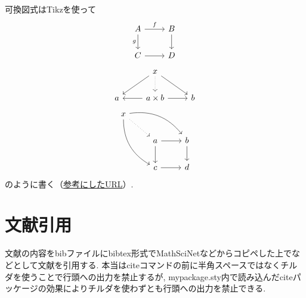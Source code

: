 \documentclass[11pt,a4paper,oneside,lualatex]{ltjsarticle} %
\begin{document}

可換図式はTikzを使って
\[
\begin{tikzcd}
	A \ar[r, "f"] \arrow[d, "g"'] & B \ar[d] \\
	C \ar[r] & D
\end{tikzcd}
\]
\[
\begin{tikzcd}
	& x \arrow[ld] \arrow[d, dotted] \arrow[rd] & \\
	a & a\times b \arrow[l] \arrow[r] & b
\end{tikzcd}
\]
\[
\begin{tikzcd}
	x \arrow[ddr, bend right] \arrow[rrd, bend left] \arrow[rd, dotted] & & \\
	& a \arrow[r] \arrow[d] & b \arrow[d] \\
	& c \arrow[r] & d
\end{tikzcd}
\]
のように書く（\href{https://blog.miz-ar.info/2017/06/commutative-diagrams-in-latex/}{参考にしたURL}）.

%


\section{文献引用} \label{sec:bib}


文献の内容をbibファイルにbibtex形式でMathSciNetなどからコピペした上で\cite[定理 1.1]{AM}などとして文献を引用する.
本当はciteコマンドの前に半角スペースではなくチルダを使うことで行頭への出力を禁止するが, mypackage.sty内で読み込んだciteパッケージの効果によりチルダを使わずとも行頭への出力を禁止できる.
\end{document}
